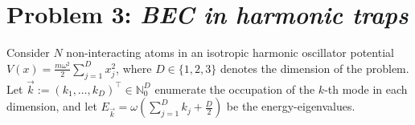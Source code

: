 \documentclass[english, parskip=full]{scrartcl}
\newcommand{\bra}{}
\newcommand{\tecxt}{}
\newcommand{\Ket}{}
\newcommand{\e}{\text{e}}
\begin{document}
\section*{Problem 3: \normalfont\textit{\large{BEC in harmonic traps}}}
Consider $N$ non-interacting atoms in an isotropic harmonic oscillator potential $V(x) = \frac{m\omega^2}{2} \sum_{j=1}^D x_j^2$, where $D\in\{1,2,3\}$ denotes the dimension of the problem.
Let $\vec{k} := (k_1,\dots ,k_D)^\top \in \mathbb{N}_0^D$ enumerate the occupation of the $k$-th mode in each dimension, and let $E_{\vec{k}} = \omega \left( \sum_{j=1}^D k_j +  \frac{D}{2} \right)$ be the energy-eigenvalues.
\end{document}
